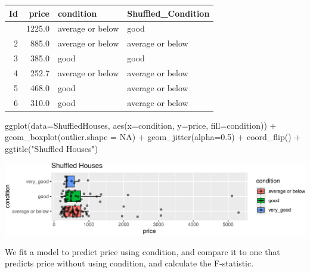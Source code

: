 \documentclass[
  letterpaper,
  DIV=11,
  numbers=noendperiod]{scrreprt}
\newenvironment{Shaded}{\begin{snugshade}}{\end{snugshade}}
\newcommand{\AttributeTok}[1]{\textcolor[rgb]{0.40,0.45,0.13}{#1}}
\newcommand{\ConstantTok}[1]{\textcolor[rgb]{0.56,0.35,0.01}{#1}}
\newcommand{\DecValTok}[1]{\textcolor[rgb]{0.68,0.00,0.00}{#1}}
\newcommand{\FloatTok}[1]{\textcolor[rgb]{0.68,0.00,0.00}{#1}}
\newcommand{\FunctionTok}[1]{\textcolor[rgb]{0.28,0.35,0.67}{#1}}
\newcommand{\NormalTok}[1]{\textcolor[rgb]{0.00,0.23,0.31}{#1}}
\newcommand{\OtherTok}[1]{\textcolor[rgb]{0.00,0.23,0.31}{#1}}
\newcommand{\SpecialCharTok}[1]{\textcolor[rgb]{0.37,0.37,0.37}{#1}}
\newcommand{\StringTok}[1]{\textcolor[rgb]{0.13,0.47,0.30}{#1}}
\begin{document}
\begin{longtable}[]{@{}rrll@{}}
\toprule\noalign{}
Id & price & condition & Shuffled\_Condition \\
\midrule\noalign{}
\endhead
\bottomrule\noalign{}
\endlastfoot
1 & 1225.0 & average or below & good \\
2 & 885.0 & average or below & average or below \\
3 & 385.0 & good & good \\
4 & 252.7 & average or below & average or below \\
5 & 468.0 & good & average or below \\
6 & 310.0 & good & average or below \\
\end{longtable}

\begin{Shaded}
\begin{Highlighting}[]
\FunctionTok{ggplot}\NormalTok{(}\AttributeTok{data=}\NormalTok{ShuffledHouses, }\FunctionTok{aes}\NormalTok{(}\AttributeTok{x=}\NormalTok{condition, }\AttributeTok{y=}\NormalTok{price, }\AttributeTok{fill=}\NormalTok{condition)) }\SpecialCharTok{+} 
  \FunctionTok{geom\_boxplot}\NormalTok{(}\AttributeTok{outlier.shape =} \ConstantTok{NA}\NormalTok{) }\SpecialCharTok{+} \FunctionTok{geom\_jitter}\NormalTok{(}\AttributeTok{alpha=}\FloatTok{0.5}\NormalTok{) }\SpecialCharTok{+} \FunctionTok{coord\_flip}\NormalTok{() }\SpecialCharTok{+} \FunctionTok{ggtitle}\NormalTok{(}\StringTok{"Shuffled Houses"}\NormalTok{)}
\end{Highlighting}
\end{Shaded}

\includegraphics{Ch3_files/figure-pdf/unnamed-chunk-238-1.pdf}

We fit a model to predict price using condition, and compare it to one
that predicts price without using condition, and calculate the
F-statistic.

\begin{Shaded}
\end{Shaded}
\end{document}
